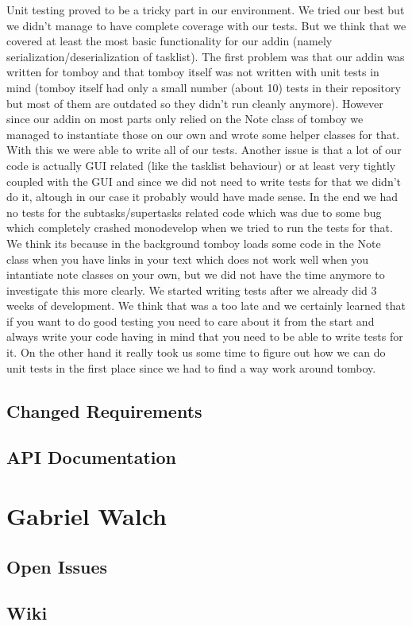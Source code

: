 \documentclass[11pt,a4paper,titlepage]{article}
\begin{document}
Unit testing proved to be a tricky part in our environment. We tried our best but we didn't manage to have complete coverage with our tests. But we think that we covered at least the most basic functionality for our addin (namely serialization/deserialization of tasklist).
The first problem was that our addin was written for tomboy and that tomboy itself was not written with unit tests in mind (tomboy itself had only a small number (about 10) tests in their repository but most of them are outdated so they didn't run cleanly anymore). However since our addin on most parts only relied on the Note class of tomboy we managed to instantiate those on our own and wrote some helper classes for that. With this we were able to write all of our tests.
Another issue is that a lot of our code is actually GUI related (like the tasklist behaviour) or at least very tightly coupled with the GUI and since we did not need to write tests for that we didn't do it, altough in our case it probably would have made sense.
In the end we had no tests for the subtasks/supertasks related code which was due to some bug which completely crashed monodevelop when we tried to run the tests for that. We think its because in the background tomboy loads some code in the Note class when you have links in your text which does not work well when you intantiate note classes on your own, but we did not have the time anymore to investigate this more clearly.
We started writing tests after we already did 3 weeks of development. We think that was a too late and we certainly learned that if you want to do good testing you need to care about it from the start and always write your code having in mind that you need to be able to write tests for it. On the other hand it really took us some time to figure out how we can do unit tests in the first place since we had to find a way work around tomboy.

\subsection{Changed Requirements}

\subsection{API Documentation}


\section{Gabriel Walch}

\subsection{Open Issues}

\subsection{Wiki}
\end{document}
